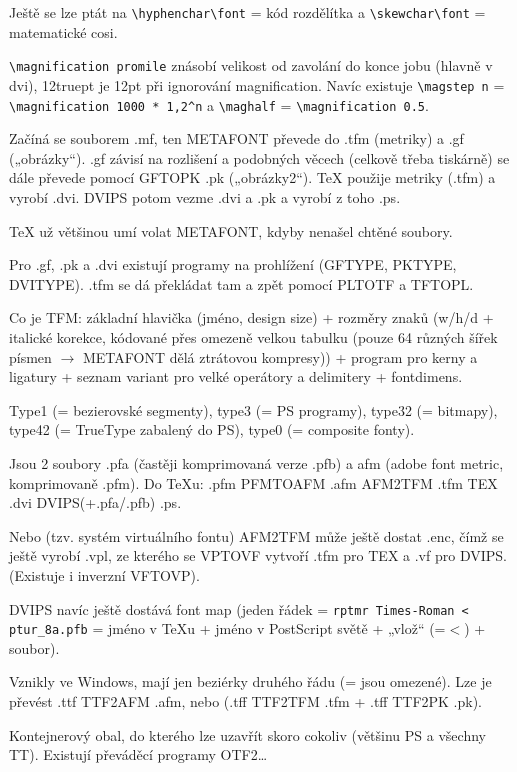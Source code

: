 \documentclass[12pt]{article}					%
\begin{document}
    \begin{poznamka}
        Ještě se lze ptát na \verb|\hyphenchar\font| = kód rozdělítka a \verb|\skewchar\font| = matematické cosi.
    \end{poznamka}

    \begin{poznamka}
        \verb|\magnification promile| znásobí velikost od zavolání do konce jobu (hlavně v dvi), 12truept je 12pt při ignorování magnification. Navíc existuje \verb|\magstep n| = \verb|\magnification 1000 * 1,2^n| a \verb|\maghalf| = \verb|\magnification 0.5|.
    \end{poznamka}

    \begin{definice}[Soubory]
        Začíná se souborem .mf, ten METAFONT převede do .tfm (metriky) a .gf („obrázky“). .gf závisí na rozlišení a podobných věcech (celkově třeba tiskárně) se dále převede pomocí GFTOPK .pk („obrázky2“). TeX použije metriky (.tfm) a vyrobí .dvi. DVIPS potom vezme .dvi a .pk a vyrobí z toho .ps.

        TeX už většinou umí volat METAFONT, kdyby nenašel chtěné soubory.

        Pro .gf, .pk a .dvi existují programy na prohlížení (GFTYPE, PKTYPE, DVITYPE). .tfm se dá překládat tam a zpět pomocí PLTOTF a TFTOPL.

        Co je TFM: základní hlavička (jméno, design size) + rozměry znaků (w/h/d + italické korekce, kódované přes omezeně velkou tabulku (pouze 64 různých šířek písmen $\rightarrow$ METAFONT dělá ztrátovou kompresy)) + program pro kerny a ligatury + seznam variant pro velké operátory a delimitery + fontdimens.
    \end{definice}

    \begin{definice}
        Type1 (= bezierovské segmenty), type3 (= PS programy), type32 (= bitmapy), type42 (= TrueType zabalený do PS), type0 (= composite fonty).

        Jsou 2 soubory .pfa (častěji komprimovaná verze .pfb) a afm (adobe font metric, komprimovaně .pfm). Do TeXu: .pfm PFMTOAFM .afm AFM2TFM .tfm TEX .dvi DVIPS(+.pfa/.pfb) .ps.

        Nebo (tzv. systém virtuálního fontu) AFM2TFM může ještě dostat .enc, čímž se ještě vyrobí .vpl, ze kterého se VPTOVF vytvoří .tfm pro TEX a .vf pro DVIPS. (Existuje i inverzní VFTOVP).

        DVIPS navíc ještě dostává font map (jeden řádek = \verb|rptmr Times-Roman < ptur_8a.pfb| = jméno v TeXu + jméno v PostScript světě + „vlož“ (=$<$) + soubor).
    \end{definice}

    \begin{definice}
        Vznikly ve Windows, mají jen beziérky druhého řádu (= jsou omezené). Lze je převést .ttf TTF2AFM .afm, nebo (.tff TTF2TFM .tfm + .tff TTF2PK .pk).
    \end{definice}

    \begin{definice}[OpenType]
        Kontejnerový obal, do kterého lze uzavřít skoro cokoliv (většinu PS a všechny TT). Existují převáděcí programy OTF2…
    \end{definice}
\end{document}
